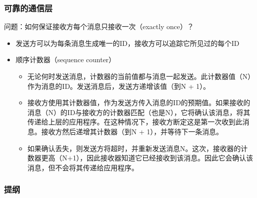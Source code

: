 \begin{frame}[fragile]
    \frametitle{可靠的通信层}
    问题：如何保证接收方每个消息只接收一次（exactly once）？
    \begin{itemize}
        \item 发送方可以为每条消息生成唯一的ID，接收方可以追踪它所见过的每个ID
        \item  顺序计数器（sequence counter）
            \begin{itemize}
            \item 无论何时发送消息，计数器的当前值都与消息一起发送。此计数器值（N）作为消息的ID。发送消息后，发送方递增该值（到N + 1）。
            \item 接收方使用其计数器值，作为发送方传入消息的ID的预期值。如果接收的消息（N）的ID与接收方的计数器匹配（也是N），它将确认该消息，将其传递给上层的应用程序。在这种情况下，接收方断定这是第一次收到此消息。接收方然后递增其计数器（到N + 1），并等待下一条消息。
            \item 如果确认丢失，则发送方将超时，并重新发送消息N。这次，接收器的计数器更高（N+1），因此接收器知道它已经接收到该消息。因此它会确认该消息，但不会将其传递给应用程序。
            \end{itemize}
    \end{itemize}
    
\end{frame}

\begin{frame}
    \frametitle{提纲} %
    \tableofcontents %
    
    
\end{frame}
